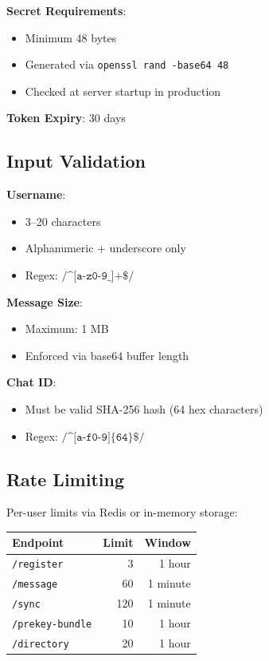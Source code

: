 \documentclass[11pt,a4paper,oneside]{article}
\begin{document}
\textbf{Secret Requirements}:
\begin{itemize}
\item Minimum 48 bytes
\item Generated via \texttt{openssl rand -base64 48}
\item Checked at server startup in production
\end{itemize}

\textbf{Token Expiry}: 30 days

\subsection{Input Validation}

\textbf{Username}:
\begin{itemize}
\item 3--20 characters
\item Alphanumeric + underscore only
\item Regex: $\texttt{/^[a-z0-9\_]+\$/}$
\end{itemize}

\textbf{Message Size}:
\begin{itemize}
\item Maximum: 1 MB
\item Enforced via base64 buffer length
\end{itemize}

\textbf{Chat ID}:
\begin{itemize}
\item Must be valid SHA-256 hash (64 hex characters)
\item Regex: $\texttt{/^[a-f0-9]\{64\}\$/}$
\end{itemize}

\subsection{Rate Limiting}

Per-user limits via Redis or in-memory storage:

\begin{table}[h]
\centering
\begin{tabular}{lrr}
\toprule
Endpoint & Limit & Window \\
\midrule
\texttt{/register} & 3 & 1 hour \\
\texttt{/message} & 60 & 1 minute \\
\texttt{/sync} & 120 & 1 minute \\
\texttt{/prekey-bundle} & 10 & 1 hour \\
\texttt{/directory} & 20 & 1 hour \\
\bottomrule
\end{tabular}
\end{table}
\end{document}
